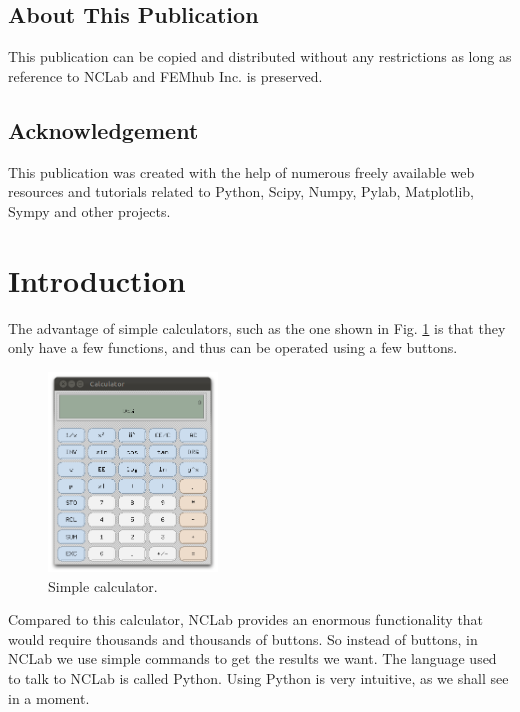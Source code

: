 \documentclass[article,A4,12pt]{llncs}
\begin{document}
\subsection*{About This Publication}
This publication can be copied and distributed without any restrictions
as long as reference to NCLab and FEMhub Inc. is preserved.

\subsection*{Acknowledgement}
This publication was created with the help of numerous freely 
available web resources and tutorials related to Python, Scipy,
Numpy, Pylab, Matplotlib, Sympy and other projects.

\normalsize

\newpage
\setcounter{tocdepth}{2}
\tableofcontents

\newpage

\pagestyle{plain}
\setcounter{page}{1}



\section{Introduction}

The advantage of simple calculators, such as the one shown in Fig. \ref{fig:xcalc}
is that they only have a few functions, and thus can be operated using a few buttons.

\begin{figure}[!ht]
\begin{center}
\includegraphics[width=0.4\textwidth]{img/xcalc.png}
\end{center}
\caption{Simple calculator.}
\label{fig:xcalc}
\end{figure}
\noindent
Compared to this calculator, NCLab provides an enormous functionality 
that would require thousands and thousands of buttons. So instead of buttons,
in NCLab we use simple commands to get the results we want. The language used 
to talk to NCLab is called Python. Using Python is very intuitive, 
as we shall see in a moment.
\end{document}
